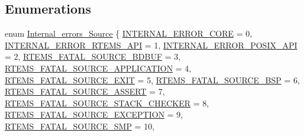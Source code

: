 \subsection*{Enumerations}
\begin{DoxyCompactItemize}
\item 
enum \mbox{\hyperlink{group__RTEMSScoreIntErr_ga878b4de77df7d0b83d19609d4de42c26}{Internal\+\_\+errors\+\_\+\+Source}} \{ \newline
\mbox{\hyperlink{group__RTEMSScoreIntErr_gga878b4de77df7d0b83d19609d4de42c26a7020d5b80b44f7535a7b4e020927ae0b}{I\+N\+T\+E\+R\+N\+A\+L\+\_\+\+E\+R\+R\+O\+R\+\_\+\+C\+O\+RE}} = 0, 
\mbox{\hyperlink{group__RTEMSScoreIntErr_gga878b4de77df7d0b83d19609d4de42c26acf3205249e2db18cdc2d57092712222d}{I\+N\+T\+E\+R\+N\+A\+L\+\_\+\+E\+R\+R\+O\+R\+\_\+\+R\+T\+E\+M\+S\+\_\+\+A\+PI}} = 1, 
\mbox{\hyperlink{group__RTEMSScoreIntErr_gga878b4de77df7d0b83d19609d4de42c26aceb51291fb6660f40749c4140fe3d458}{I\+N\+T\+E\+R\+N\+A\+L\+\_\+\+E\+R\+R\+O\+R\+\_\+\+P\+O\+S\+I\+X\+\_\+\+A\+PI}} = 2, 
\mbox{\hyperlink{group__RTEMSScoreIntErr_gga878b4de77df7d0b83d19609d4de42c26a964719c0c235d18607071c167838c397}{R\+T\+E\+M\+S\+\_\+\+F\+A\+T\+A\+L\+\_\+\+S\+O\+U\+R\+C\+E\+\_\+\+B\+D\+B\+UF}} = 3, 
\newline
\mbox{\hyperlink{group__RTEMSScoreIntErr_gga878b4de77df7d0b83d19609d4de42c26a0ef9bd9df1f13771c172dcbb914c0a42}{R\+T\+E\+M\+S\+\_\+\+F\+A\+T\+A\+L\+\_\+\+S\+O\+U\+R\+C\+E\+\_\+\+A\+P\+P\+L\+I\+C\+A\+T\+I\+ON}} = 4, 
\mbox{\hyperlink{group__RTEMSScoreIntErr_gga878b4de77df7d0b83d19609d4de42c26a8f786035127bfad5b91f8060e9a671e1}{R\+T\+E\+M\+S\+\_\+\+F\+A\+T\+A\+L\+\_\+\+S\+O\+U\+R\+C\+E\+\_\+\+E\+X\+IT}} = 5, 
\mbox{\hyperlink{group__RTEMSScoreIntErr_gga878b4de77df7d0b83d19609d4de42c26ac275f59e4e2a97b960a54c88d093928c}{R\+T\+E\+M\+S\+\_\+\+F\+A\+T\+A\+L\+\_\+\+S\+O\+U\+R\+C\+E\+\_\+\+B\+SP}} = 6, 
\mbox{\hyperlink{group__RTEMSScoreIntErr_gga878b4de77df7d0b83d19609d4de42c26a460415c3d644f500f7072aaf9781ebee}{R\+T\+E\+M\+S\+\_\+\+F\+A\+T\+A\+L\+\_\+\+S\+O\+U\+R\+C\+E\+\_\+\+A\+S\+S\+E\+RT}} = 7, 
\newline
\mbox{\hyperlink{group__RTEMSScoreIntErr_gga878b4de77df7d0b83d19609d4de42c26af8a6e2199c224357b5295ecfa98f94bd}{R\+T\+E\+M\+S\+\_\+\+F\+A\+T\+A\+L\+\_\+\+S\+O\+U\+R\+C\+E\+\_\+\+S\+T\+A\+C\+K\+\_\+\+C\+H\+E\+C\+K\+ER}} = 8, 
\mbox{\hyperlink{group__RTEMSScoreIntErr_gga878b4de77df7d0b83d19609d4de42c26a131fe6aad46a1394f8bb0f2a5f19fa05}{R\+T\+E\+M\+S\+\_\+\+F\+A\+T\+A\+L\+\_\+\+S\+O\+U\+R\+C\+E\+\_\+\+E\+X\+C\+E\+P\+T\+I\+ON}} = 9, 
\mbox{\hyperlink{group__RTEMSScoreIntErr_gga878b4de77df7d0b83d19609d4de42c26a7410f36f118ea9bb53417d0b40f96e80}{R\+T\+E\+M\+S\+\_\+\+F\+A\+T\+A\+L\+\_\+\+S\+O\+U\+R\+C\+E\+\_\+\+S\+MP}} = 10, 

\end{DoxyCompactItemize}

